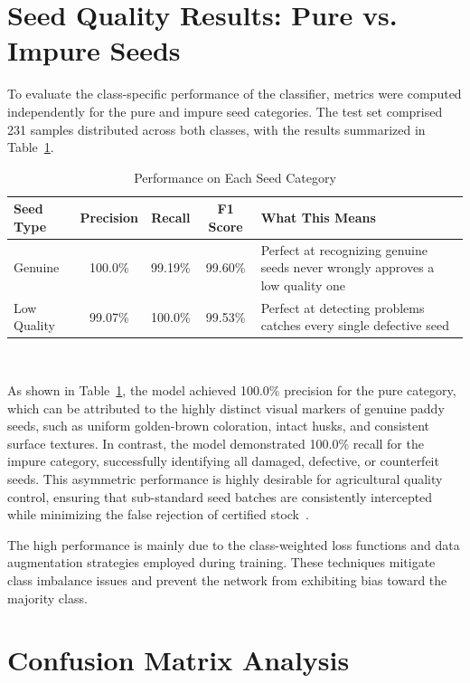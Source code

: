 \section{Seed Quality Results: Pure vs. Impure Seeds}

To evaluate the class-specific performance of the classifier, metrics were computed independently for the pure and impure seed categories. The test set comprised 231 samples distributed across both classes, with the results summarized in Table~\ref{tab:perclass}.

\begin{table}[htbp]
  \centering
  \caption{Performance on Each Seed Category}
  \label{tab:perclass}
  \small
  \renewcommand{\arraystretch}{1.1}
  \begin{tabularx}{\textwidth}{|p{3.8cm}|c|c|c|X|}
    \hline
    \textbf{Seed Type} & \textbf{Precision} & \textbf{Recall} & \textbf{F1 Score} & \textbf{What This Means} \\
    \hline
    Genuine & 100.0\% & 99.19\% & 99.60\% & Perfect at recognizing genuine seeds never wrongly approves a low quality one \\
    \hline
    Low Quality & 99.07\% & 100.0\% & 99.53\% & Perfect at detecting problems catches every single defective seed \\
    \hline
  \end{tabularx}
\\
\end{table}

As shown in Table~\ref{tab:perclass}, the model achieved 100.0\% precision for the pure category, which can be attributed to the highly distinct visual markers of genuine paddy seeds, such as uniform golden-brown coloration, intact husks, and consistent surface textures. In contrast, the model demonstrated 100.0\% recall for the impure category, successfully identifying all damaged, defective, or counterfeit seeds. This asymmetric performance is highly desirable for agricultural quality control, ensuring that sub-standard seed batches are consistently intercepted while minimizing the false rejection of certified stock~\cite{liu2020}.

The high performance is mainly due to the class-weighted loss functions and data augmentation strategies employed during training. These techniques mitigate class imbalance issues and prevent the network from exhibiting bias toward the majority class.
\newpage
\section{Confusion Matrix Analysis}

